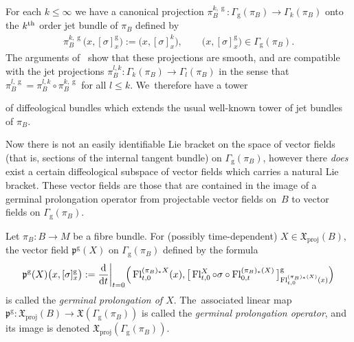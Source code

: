 \documentclass[pdftex]{sigma}
\numberwithin{equation}{section}
\def\g{\operatorname{g}}
\def\proj{\operatorname{proj}}
\def\Fl{\operatorname{Fl}}
\def\XF{{\mathfrak{X}}}
\def\pf{{\mathfrak{p}}}
\begin{document}
For each $k\leq\infty$ we have a canonical projection $\pi_{B}^{k,\g}\colon \Gamma_{\g}(\pi_{B})\rightarrow \Gamma_{k}(\pi_{B})$ onto the $k^{\rm th}$ order jet bundle of $\pi_{B}$ defined by
\begin{gather*}
\pi_{B}^{k,\g}\big(x,[\sigma]^{\g}_{x}\big):=\big(x,[\sigma]^{k}_{x}\big),\qquad \big(x,[\sigma]^{\g}_{x}\big)\in\Gamma_{\g}(\pi_{B}).
\end{gather*}
The arguments of~\cite[Proposition~5.14]{mac3} show that these projections are smooth, and are compatible with the jet projections $\pi_{B}^{l,k}\colon \Gamma_{k}(\pi_{B})\rightarrow \Gamma_{l}(\pi_{B})$ in the sense that $\pi_{B}^{l,\g} = \pi_{B}^{l,k}\circ\pi_{B}^{k,\g}$ for all $l\leq k$. We~therefore have a tower
\begin{center}
\end{center}
of diffeological bundles which extends the usual well-known tower of jet bundles of $\pi_{B}$.

Now there is not an easily identifiable Lie bracket on the space of vector fields (that is, sections of the internal tangent bundle) on $\Gamma_{\g}(\pi_{B})$, however there \textit{does} exist a certain diffeological subspace of vector fields which carries a natural Lie bracket. These vector fields are those that are contained in the image of a germinal prolongation operator from projectable vector fields on~$B$ to vector fields on $\Gamma_{\g}(\pi_{B})$.

\begin{Definition}
Let $\pi_{B}\colon B\rightarrow M$ be a fibre bundle. For (possibly time-dependent) $X\in\XF_{\proj}(B)$, the vector field $\pf^{\g}(X)$ on $\Gamma_{\g}(\pi_{B})$ defined by the formula
\begin{gather*}
\pf^{\g}(X)\big(x,[\sigma]^{\g}_{x}\big):=\frac{\rm d}{{\rm d}t}\bigg|_{t=0} \Big(\Fl^{(\pi_{B})_{*}X}_{t,0}(x),\big[\Fl^{X}_{t,0}\circ\sigma \circ\Fl^{(\pi_{B})_{*}(X)}_{0,t}\big]^{\g}_{\Fl^{(\pi_{B})_{*}(X)}_{t,0}(x)}\Big)
\end{gather*}
is called the \textit{germinal prolongation of $X$}. The~associated linear map $\pf^{\g}\colon \XF_{\proj}(B)\rightarrow \XF(\Gamma_{\g}(\pi_{B}))$ is called the \textit{germinal prolongation operator}, and its image is denoted $\XF_{\proj}(\Gamma_{\g}(\pi_{B}))$.
\end{Definition}
\end{document}
